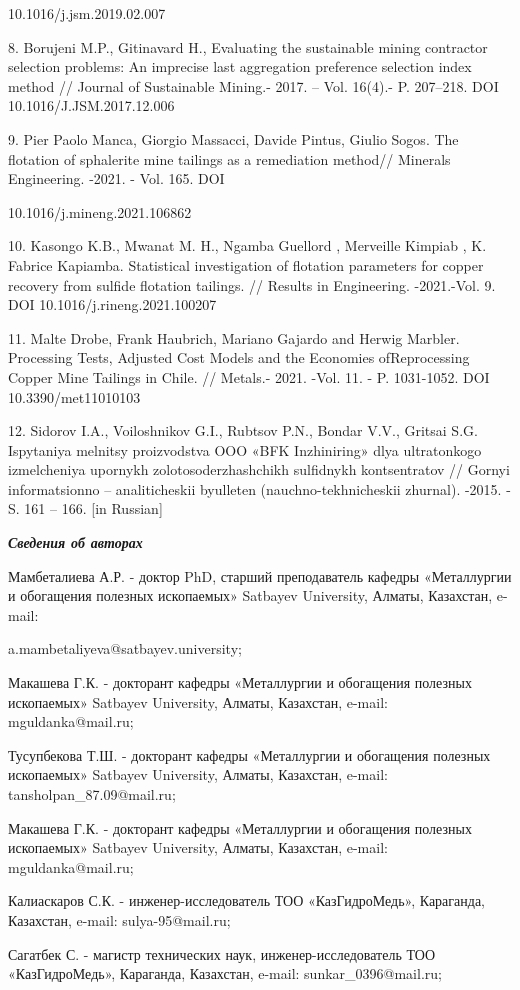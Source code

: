 \begin{noparindent}
10.1016/j.jsm.2019.02.007

8. Borujeni M.P., Gitinavard H., Evaluating the sustainable mining
contractor selection problems: An imprecise last aggregation preference
selection index method // Journal of Sustainable Mining.- 2017. -- Vol.
16(4).- P. 207--218. DOI 10.1016/J.JSM.2017.12.006

9. Pier Paolo Manca, Giorgio Massacci, Davide Pintus, Giulio Sogos. The
flotation of sphalerite mine tailings as a remediation method// Minerals
Engineering. -2021. - Vol. 165. DOI

10.1016/j.mineng.2021.106862

10. Kasongo K.B., Mwanat M. H., Ngamba Guellord , Merveille Kimpiab , K.
Fabrice Kapiamba. Statistical investigation of flotation parameters for
copper recovery from sulfide flotation tailings. // Results in
Engineering. -2021.-Vol. 9. DOI 10.1016/j.rineng.2021.100207

11. Malte Drobe, Frank Haubrich, Mariano Gajardo and Herwig Marbler.
Processing Tests, Adjusted Cost Models and the Economies ofReprocessing
Copper Mine Tailings in Chile. // Metals.- 2021. -Vol. 11. - P.
1031-1052. DOI 10.3390/met11010103

12. Sidorov I.A., Voiloshnikov G.I., Rubtsov P.N.,
Bondar\textquotesingle{} V.V., Gritsai S.G. Ispytaniya
mel\textquotesingle nitsy proizvodstva OOO «BFK Inzhiniring» dlya
ul\textquotesingle tratonkogo izmel\textquotesingle cheniya upornykh
zolotosoderzhashchikh sul\textquotesingle fidnykh kontsentratov //
Gornyi informatsionno -- analiticheskii byulleten\textquotesingle{}
(nauchno-tekhnicheskii zhurnal). -2015. - S. 161 -- 166. {[}in
Russian{]}
\end{noparindent}

\emph{{\bfseries Сведения об авторах}}

\begin{noparindent}
Мамбеталиева А.Р. - доктор PhD, старший преподаватель кафедры
«Металлургии и обогащения полезных ископаемых» Satbayev University,
Алматы, Казахстан, e-mail:

a.mambetaliyeva@satbayev.university;

Макашева Г.К. - докторант кафедры «Металлургии и обогащения полезных
ископаемых» Satbayev University, Алматы, Казахстан, e-mail:
mguldanka@mail.ru;

Тусупбекова Т.Ш. - докторант кафедры «Металлургии и обогащения полезных
ископаемых» Satbayev University, Алматы, Казахстан, e-mail:
tansholpan\_87.09@mail.ru;

Макашева Г.К. - докторант кафедры «Металлургии и обогащения полезных
ископаемых» Satbayev University, Алматы, Казахстан, e-mail:
mguldanka@mail.ru;

Калиаскаров С.К. - инженер-исследователь ТОО «КазГидроМедь», Караганда,
Казахстан, e-mail: sulya-95@mail.ru;

Сагатбек С. - магистр технических наук, инженер-исследователь ТОО
«КазГидроМедь», Караганда, Казахстан, e-mail: sunkar\_0396@mail.ru;
\end{noparindent}

